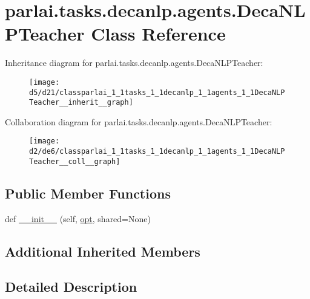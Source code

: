 \hypertarget{classparlai_1_1tasks_1_1decanlp_1_1agents_1_1DecaNLPTeacher}{}\section{parlai.\+tasks.\+decanlp.\+agents.\+Deca\+N\+L\+P\+Teacher Class Reference}
\label{classparlai_1_1tasks_1_1decanlp_1_1agents_1_1DecaNLPTeacher}


Inheritance diagram for parlai.\+tasks.\+decanlp.\+agents.\+Deca\+N\+L\+P\+Teacher\+:\nopagebreak
\begin{figure}[H]
\begin{center}
\leavevmode
\texttt{[image: d5/d21/classparlai\_1\_1tasks\_1\_1decanlp\_1\_1agents\_1\_1DecaNLPTeacher\_\_inherit\_\_graph]}
\end{center}
\end{figure}


Collaboration diagram for parlai.\+tasks.\+decanlp.\+agents.\+Deca\+N\+L\+P\+Teacher\+:\nopagebreak
\begin{figure}[H]
\begin{center}
\leavevmode
\texttt{[image: d2/de6/classparlai\_1\_1tasks\_1\_1decanlp\_1\_1agents\_1\_1DecaNLPTeacher\_\_coll\_\_graph]}
\end{center}
\end{figure}
\subsection*{Public Member Functions}
\begin{DoxyCompactItemize}
\item 
def \hyperlink{classparlai_1_1tasks_1_1decanlp_1_1agents_1_1DecaNLPTeacher_a2928fb06e1bf1f282b8019cc34e1d1ce}{\+\_\+\+\_\+init\+\_\+\+\_\+} (self, \hyperlink{classparlai_1_1core_1_1agents_1_1MultiTaskTeacher_a116b724be9c512d36f1d43cb9be86b78}{opt}, shared=None)
\end{DoxyCompactItemize}
\subsection*{Additional Inherited Members}


\subsection{Detailed Description}


